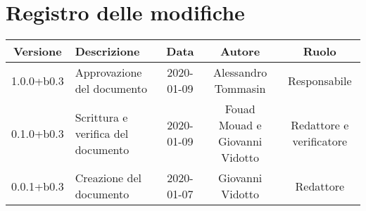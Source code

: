\section*{Registro delle modifiche}

\begin{center}
	\begin{longtable}{|c|p{3cm}|c|c|c|}
	\hline
	\rowcolor{lighter-grayer}
	\textbf{Versione} & \textbf{Descrizione} & \textbf{Data} & \textbf{Autore} & \textbf{Ruolo} \\
	\hline
	\endfirsthead


	1.0.0+b0.3 & Approvazione del documento & 2020-01-09 & Alessandro Tommasin & Responsabile \\
	\hline
	0.1.0+b0.3 & Scrittura e verifica del documento & 2020-01-09 & Fouad Mouad e Giovanni Vidotto & Redattore e verificatore \\
	\hline
	0.0.1+b0.3 & Creazione del documento & 2020-01-07 & Giovanni Vidotto & Redattore \\
	\hline

	\end{longtable}
\end{center}